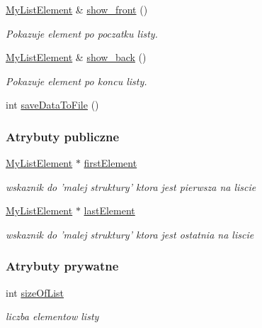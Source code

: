 \begin{DoxyCompactItemize}
\hyperlink{class_my_list_1_1_my_list_element}{My\-List\-Element} \& \hyperlink{class_my_list_a9d7990c6a8b96d4c0d267fe46582fd6b}{show\-\_\-front} ()
\begin{DoxyCompactList}\small\item\em Pokazuje element po poczatku listy. \end{DoxyCompactList}\item 
\hyperlink{class_my_list_1_1_my_list_element}{My\-List\-Element} \& \hyperlink{class_my_list_ab67b7b37e96d5cb31742efbdf283fa9f}{show\-\_\-back} ()
\begin{DoxyCompactList}\small\item\em Pokazuje element po koncu listy. \end{DoxyCompactList}\item 
int \hyperlink{class_my_list_a94a6183f4d3248ca593b51a173bd2d50}{save\-Data\-To\-File} ()
\end{DoxyCompactItemize}
\subsubsection*{Atrybuty publiczne}
\begin{DoxyCompactItemize}
\item 
\hyperlink{class_my_list_1_1_my_list_element}{My\-List\-Element} $\ast$ \hyperlink{class_my_list_aa7e5ddd2dddeeccd304126130d73dead}{first\-Element}
\begin{DoxyCompactList}\small\item\em wskaznik do 'malej struktury' ktora jest pierwsza na liscie \end{DoxyCompactList}\item 
\hyperlink{class_my_list_1_1_my_list_element}{My\-List\-Element} $\ast$ \hyperlink{class_my_list_a287894c4add6b52be99826fb4d76594c}{last\-Element}
\begin{DoxyCompactList}\small\item\em wskaznik do 'malej struktury' ktora jest ostatnia na liscie \end{DoxyCompactList}\end{DoxyCompactItemize}
\subsubsection*{Atrybuty prywatne}
\begin{DoxyCompactItemize}
\item 
int \hyperlink{class_my_list_a77b7870f617b51fad7399463c9147668}{size\-Of\-List}
\begin{DoxyCompactList}\small\item\em liczba elementow listy \end{DoxyCompactList}\end{DoxyCompactItemize}



